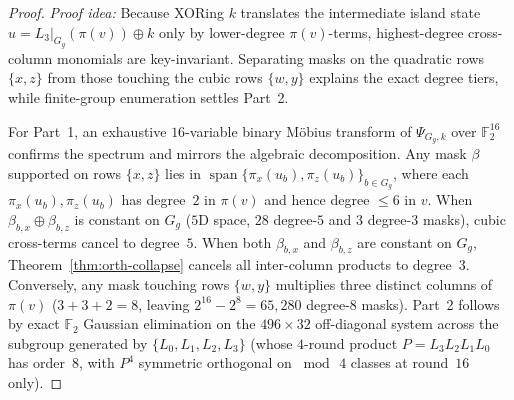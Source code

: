 \documentclass[11pt,a4paper]{article}
\theoremstyle{definition}
\theoremstyle{remark}
\newcommand{\Ftwo}{\mathbb{F}_2}
\newcommand{\spanF}{\operatorname{span}}
\begin{document}
\begin{proof}
\emph{Proof idea:} Because XORing $k$ translates the intermediate island state $u = L_3|_{G_g}(\pi(v)) \oplus k$ only by lower-degree $\pi(v)$-terms, highest-degree cross-column monomials are key-invariant. Separating masks on the quadratic rows $\{x,z\}$ from those touching the cubic rows $\{w,y\}$ explains the exact degree tiers, while finite-group enumeration settles Part~2.

For Part~1, an exhaustive $16$-variable binary M\"{o}bius transform of $\Psi_{G_g,k}$ over $\Ftwo^{16}$ confirms the spectrum and mirrors the algebraic decomposition. Any mask $\beta$ supported on rows $\{x,z\}$ lies in $\spanF\{\pi_x(u_b),\allowbreak \pi_z(u_b)\}_{b \in G_g}$, where each $\pi_x(u_b), \pi_z(u_b)$ has degree~$2$ in $\pi(v)$ and hence degree $\le 6$ in $v$. When $\beta_{b,x} \oplus \beta_{b,z}$ is constant on $G_g$ ($5$D space, $28$ degree-$5$ and $3$ degree-$3$ masks), cubic cross-terms cancel to degree~$5$. When both $\beta_{b,x}$ and $\beta_{b,z}$ are constant on $G_g$, Theorem~\ref{thm:orth-collapse} cancels all inter-column products to degree~$3$. Conversely, any mask touching rows $\{w,y\}$ multiplies three distinct columns of $\pi(v)$ ($3+3+2 = 8$, leaving $2^{16}-2^8 = 65{,}280$ degree-$8$ masks). Part~2 follows by exact $\Ftwo$ Gaussian elimination on the $496 \times 32$ off-diagonal system across the subgroup generated by $\{L_0, L_1, L_2, L_3\}$ (whose $4$-round product $P = L_3 L_2 L_1 L_0$ has order~$8$, with $P^4$ symmetric orthogonal on $\bmod\,4$ classes at round~$16$ only).
\end{proof}
\end{document}
